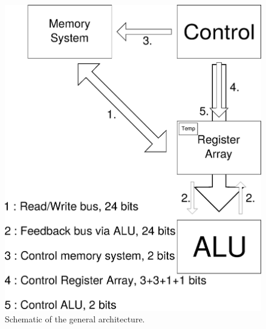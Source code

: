 \documentclass[a4paper, 11pt]{article}
\begin{document}
\begin{figure}[h]
\center
\caption{\label{general}Schematic of the general architecture.}
   \includegraphics[scale=0.5]{globalArchi.eps}
\end{figure}
\end{document}
